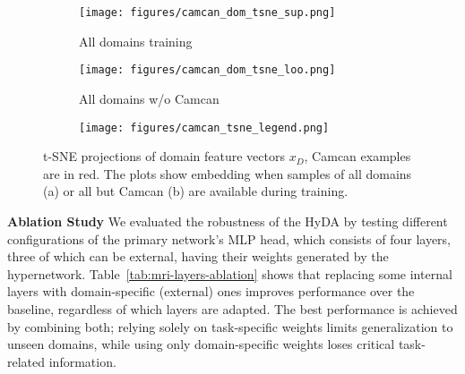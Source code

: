 \documentclass[runningheads]{llncs}
\begin{document}
\begin{figure}[ht]
    \centering
    \begin{subfigure}{0.35\textwidth}
        \centering
        \texttt{[image: figures/camcan\_dom\_tsne\_sup.png]}
        \caption{All domains training}
    \end{subfigure}
    \hfill
    \begin{subfigure}{0.35\textwidth}
        \centering
        \texttt{[image: figures/camcan\_dom\_tsne\_loo.png]}
        \caption{All domains w/o Camcan}
    \end{subfigure}
    \hfill
    \begin{subfigure}{0.13\textwidth}
        \centering
        \texttt{[image: figures/camcan\_tsne\_legend.png]}
    \end{subfigure}
    \caption{t-SNE projections of domain feature vectors $x_D$, Camcan examples are in red. The plots show embedding when samples of all domains (a) or all but Camcan (b) are available during training.}
    \label{fig:mri-camcan-tsne}
\end{figure}
\noindent\textbf{Ablation Study}
We evaluated the robustness of the HyDA by testing different configurations of the primary network's MLP head, which consists of four layers, three of which can be external, having their weights generated by the hypernetwork. Table~\ref{tab:mri-layers-ablation} shows that replacing some internal layers with domain-specific (external) ones improves performance over the baseline, regardless of which layers are adapted. The best performance is achieved by combining both; relying solely on task-specific weights limits generalization to unseen domains, while using only domain-specific weights loses critical task-related information.
\end{document}

